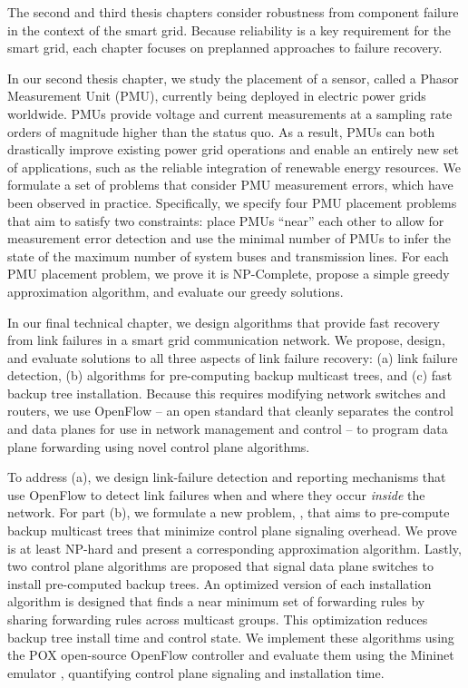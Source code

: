 The second and third thesis chapters consider robustness from component failure  in the context of the smart grid. Because reliability is a key requirement for the smart grid, each chapter focuses 
on preplanned approaches to failure recovery.

In our second thesis chapter, we study the placement of a sensor, called a Phasor Measurement Unit (PMU), currently being deployed in electric power grids worldwide. 
PMUs provide voltage and current measurements at a sampling rate orders of magnitude higher than the status quo.  As a result, PMUs can 
both drastically improve existing power grid operations and enable an entirely new set of applications, such as the reliable integration of renewable energy resources. 
We formulate a set of problems that consider PMU measurement errors, which have been observed in practice.  Specifically, we specify four PMU placement problems
that aim to satisfy two constraints: place PMUs ``near'' each other to allow for measurement error detection and use the minimal number of PMUs to infer the state of the maximum number of system buses and transmission lines. 
For each PMU placement problem, we prove it is NP-Complete, propose a simple greedy approximation algorithm, and evaluate our greedy solutions.

In our final technical chapter, we design algorithms that provide fast recovery from link failures in a smart grid communication network. 
We propose, design, and evaluate solutions to all three aspects of link failure recovery: (a) link failure detection, (b) algorithms for pre-computing backup multicast trees, and
(c) fast backup tree installation. Because this requires modifying network switches and routers, we use OpenFlow -- an open standard that cleanly separates the control 
and data planes for use in network management and control -- to program data plane forwarding using novel control plane algorithms. 


To address (a), we design link-failure detection and reporting mechanisms that use OpenFlow to detect link failures when and where they occur \emph{inside} the network.
For part (b), we formulate a new problem, \mcs, that aims to pre-compute backup multicast trees that minimize control plane signaling overhead. We prove \mc 
is at least NP-hard and present a corresponding approximation algorithm.
Lastly, two control plane algorithms are proposed that signal data plane switches to install pre-computed backup trees. 
An optimized version of each installation algorithm is designed that finds a near minimum set of forwarding rules 
by sharing forwarding rules across multicast groups. This optimization
reduces backup tree install time and control state.  
We implement these algorithms using the POX open-source OpenFlow controller \cite{Pox} and evaluate them using the Mininet emulator \cite{Lantz10}, quantifying control plane signaling and 
installation time.





